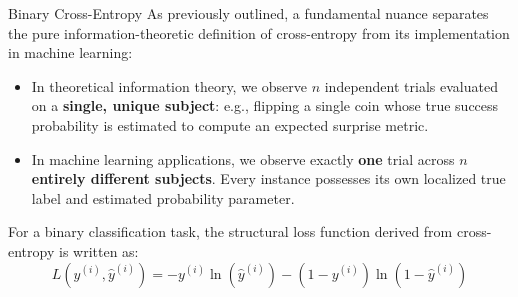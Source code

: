 \begin{frame}{Binary Cross-Entropy}
	As previously outlined, a fundamental nuance separates the pure information-theoretic definition of cross-entropy from its implementation in machine learning:
	\begin{itemize}
		\item In theoretical information theory, we observe $n$ independent trials evaluated on a \textbf{single, unique subject}: e.g., flipping a single coin whose true success probability is estimated to compute an expected surprise metric.
		\item In machine learning applications, we observe exactly \textbf{one} trial across $n$ \textbf{entirely different subjects}. Every instance possesses its own localized true label and estimated probability parameter.
	\end{itemize}
	\pause
	For a binary classification task, the structural loss function derived from cross-entropy is written as:
	\begin{equation*}
		L\left(y^{(i)}, \hat{y}^{(i)}\right) = - y^{(i)} \ln{\left(\hat{y}^{(i)}\right)} - \left(1 - y^{(i)}\right) \ln{\left(1 - \hat{y}^{(i)}\right)}
	\end{equation*}
\end{frame}

